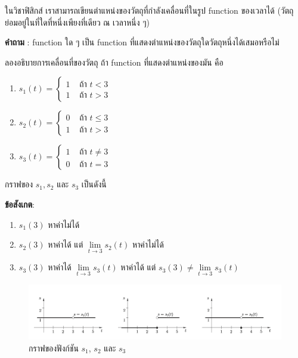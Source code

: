 \documentclass[
]{book}
\theoremstyle{definition}
\theoremstyle{definition}
\theoremstyle{definition}
\theoremstyle{definition}
\theoremstyle{remark}
\begin{document}
ในวิชาฟิสิกส์ เราสามารถเขียนตำแหน่งของวัตถุที่กำลังเคลื่อนที่ในรูป function ของเวลาได้
(วัตถุย่อมอยู่ในที่ใดที่หนึ่งเพียงที่เดียว ณ เวลาหนึ่ง ๆ)

\textbf{คำถาม} : function ใด ๆ เป็น function
ที่แสดงตำแหน่งของวัตถุใดวัตถุหนึ่งได้เสมอหรือไม่

ลองอธิบายการเคลื่อนที่ของวัตถุ ถ้า function ที่แสดงตำแหน่งของมัน คือ

\begin{enumerate}
\def\labelenumi{\arabic{enumi}.}
\item
  \(s_{1}(t)  = \begin{cases}
              1 & \text{ ถ้า } t<3 \\
              1  & \text{ ถ้า } t>3
                \end{cases}\)
\item
  \(s_{2}(t)  = \begin{cases}
              0 & \text{ ถ้า } t \le 3 \\
              1  & \text{ ถ้า } t>3
                \end{cases}\)
\item
  \(s_{3}(t)  = \begin{cases}
              1 & \text{ ถ้า } t \neq 3 \\
              0  & \text{ ถ้า } t=3
                \end{cases}\)
\end{enumerate}

กราฟของ \(s_1,s_2\) และ \(s_3\) เป็นดังนี้

\textbf{ข้อสังเกต}:

\begin{enumerate}
\def\labelenumi{\arabic{enumi}.}
\item
  \(s_1(3)\) หาค่าไม่ได้
\item
  \(s_2(3)\) หาค่าได้ แต่ \(\underset{t \rightarrow 3}{\lim} s_2(t)\)
  หาค่าไม่ได้
\item
  \(s_3(3)\) หาค่าได้ \(\underset{t \rightarrow 3}{\lim} s_3(t)\) หาค่าได้ แต่
  \(s_3(3) \neq \underset{t \rightarrow 3}{\lim} s_3(t)\)
\end{enumerate}

\begin{figure}

{\centering \includegraphics[width=0.5\linewidth]{images/fig-continuity-1} 

}

\caption{กราฟของฟังก์ชัน $s_1$, $s_2$ และ $s_3$}\label{fig:fig-continuity-1}
\end{figure}
\end{document}
